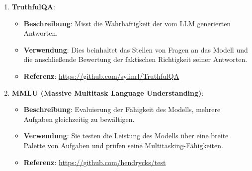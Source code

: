 \begin{enumerate}
    \item \textbf{TruthfulQA}\cite{huang_evaluating_2024}:
    \begin{itemize}
        \item \textbf{Beschreibung}: Misst die Wahrhaftigkeit der vom LLM generierten Antworten.
        \item \textbf{Verwendung}: Dies beinhaltet das Stellen von Fragen an das Modell und die anschließende Bewertung der faktischen Richtigkeit seiner Antworten.
        \item \textbf{Referenz}: \url{https://github.com/sylinrl/TruthfulQA}
    \end{itemize}
    
    \item \textbf{MMLU (Massive Multitask Language Understanding)}\cite{huang_evaluating_2024}:
    \begin{itemize}
        \item \textbf{Beschreibung}: Evaluierung der Fähigkeit des Modells, mehrere Aufgaben gleichzeitig zu bewältigen.
        \item \textbf{Verwendung}: Sie testen die Leistung des Modells über eine breite Palette von Aufgaben und prüfen seine Multitasking-Fähigkeiten.
        \item \textbf{Referenz}: \url{https://github.com/hendrycks/test}
    \end{itemize}
\end{enumerate} 

